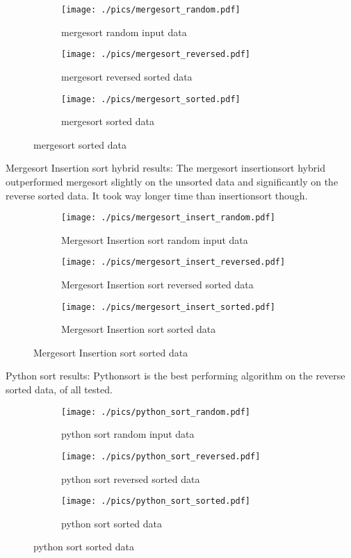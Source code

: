 \begin{figure}[H]
	\centering
	\begin{subfigure}[b]{0.5\textwidth}
		\centering
		\texttt{[image: ./pics/mergesort\_random.pdf]}
		\caption{mergesort random input data}
	\end{subfigure}
	\hfill
	\begin{subfigure}[b]{0.5\textwidth}
		\centering
		\texttt{[image: ./pics/mergesort\_reversed.pdf]}
		\caption{mergesort reversed sorted data}
	\end{subfigure}
	\hfill
	\begin{subfigure}[b]{0.5\textwidth}
		\centering
		\texttt{[image: ./pics/mergesort\_sorted.pdf]}
		\caption{mergesort sorted data}
	\end{subfigure}
\end{figure}

Mergesort Insertion sort hybrid results:
The mergesort insertionsort hybrid outperformed mergesort slightly on the unsorted data and significantly on the reverse sorted data. It took way longer time than insertionsort though.

\begin{figure}[H]
	\centering
	\begin{subfigure}[b]{0.5\textwidth}
		\centering
		\texttt{[image: ./pics/mergesort\_insert\_random.pdf]}
		\caption{Mergesort Insertion sort random input data}
	\end{subfigure}
	\hfill
	\begin{subfigure}[b]{0.5\textwidth}
		\centering
		\texttt{[image: ./pics/mergesort\_insert\_reversed.pdf]}
		\caption{Mergesort Insertion sort reversed sorted data}
	\end{subfigure}
	\hfill
	\begin{subfigure}[b]{0.5\textwidth}
		\centering
		\texttt{[image: ./pics/mergesort\_insert\_sorted.pdf]}
		\caption{Mergesort Insertion sort sorted data}
	\end{subfigure}
\end{figure}

Python sort results:
Pythonsort is the best performing algorithm on the reverse sorted data, of all tested.

\begin{figure}[H]
	\centering
	\begin{subfigure}[b]{0.5\textwidth}
		\centering
		\texttt{[image: ./pics/python\_sort\_random.pdf]}
		\caption{python sort random input data}
	\end{subfigure}
	\hfill
	\begin{subfigure}[b]{0.5\textwidth}
		\centering
		\texttt{[image: ./pics/python\_sort\_reversed.pdf]}
		\caption{python sort reversed sorted data}
	\end{subfigure}
	\hfill
	\begin{subfigure}[b]{0.5\textwidth}
		\centering
		\texttt{[image: ./pics/python\_sort\_sorted.pdf]}
		\caption{python sort sorted data}
	\end{subfigure}
\end{figure}


